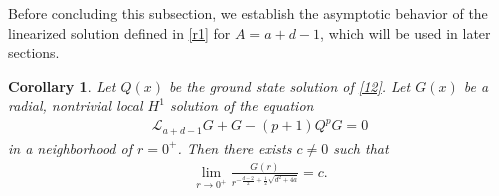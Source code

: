\documentclass[12pt]{amsart}
\newtheorem{corollary}[theorem]{Corollary}
\begin{document}
Before concluding this subsection, we establish the asymptotic behavior of the linearized solution defined in \eqref{r1} for $A=a+d-1$, which will be used in later sections. 

\begin{corollary}\label{cor: g}
Let $Q(x)$ be the ground state solution of \eqref{12}. 
Let $G(x)$ be a radial, nontrivial local $H^1$ solution of the equation 
\begin{align}\label{r10}
\mathcal L_{a+d-1}G+G-(p+1)Q^p G=0
\end{align}
in a neighborhood of $r=0^+$. Then there exists $c\neq 0$ such that 
\begin{align}\label{r11}
\lim_{r\to 0^+}\frac {G(r)}{r^{-\frac{d-2}2+\frac 12\sqrt{d^2+4a}}}=c. 
\end{align}
\end{corollary}
\end{document}
